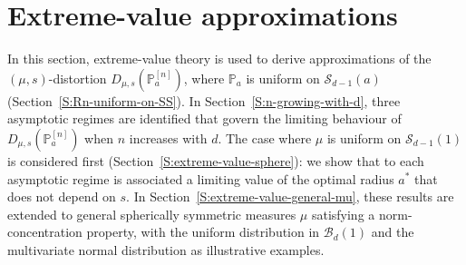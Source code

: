 \documentclass{article}
\def\PP{\mathbb{P}}
\def\SB{{\mathscr B}}
\def\SS{{\mathcal S}}
\begin{document}
%





\section{Extreme-value approximations}\label{S:asymptotic}


In this section, extreme-value theory is used to derive approximations of the $(\mu,s)$-distortion $D_{\mu,s}(\PP_a^{[n]})$, where $\PP_a$ is uniform on $\SS_{d-1}(a)$ (Section~\ref{S:Rn-uniform-on-SS}).
In Section~\ref{S:n-growing-with-d}, three asymptotic regimes are identified that govern the limiting behaviour of $D_{\mu,s}(\PP_a^{[n]})$ when $n$ increases with $d$.
The case where $\mu$ is uniform on $\SS_{d-1}(1)$ is considered first (Section~\ref{S:extreme-value-sphere}): we show that to each asymptotic regime is associated a limiting value of the optimal radius $a^*$ that does not depend on $s$. In Section~\ref{S:extreme-value-general-mu}, these results are extended to general spherically symmetric measures $\mu$ satisfying a norm-concentration property, with the uniform distribution in $\SB_d(1)$ and the multivariate normal distribution as illustrative examples.




\end{document}
